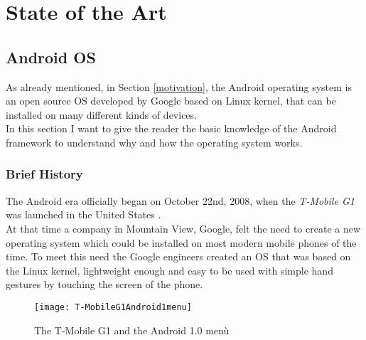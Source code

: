 %
%
\chapter{State of the Art}
%
\label{cap:statoarte}
%
%
\section{Android OS} \label{androidos}
\par As already mentioned, in Section \ref{motivation}, the Android operating system is an open source OS developed by Google based on Linux kernel, that can be installed on many different kinds of devices.\\
In this section I want to give the reader the basic knowledge of the Android framework to understand why and how the operating system works.
\subsection{Brief History} \label{briefhist}
\par
The Android era officially began on October 22nd, 2008, when the \textit{T-Mobile G1} was launched in the United States \cite{verge2011android}.\\
At that time a company in Mountain View, Google, felt the need to create a new operating system which could be installed on most modern mobile phones of the time. To meet this need the Google engineers created an OS that was based on the Linux kernel, lightweight enough and easy to be used with simple hand gestures by touching the screen of the phone.\\

\begin{figure}[h]
	\centering
	\texttt{[image: T-MobileG1Android1menu]}
	\caption{The T-Mobile G1 and the Android 1.0 menù}
	\label{2.1:The T-Mobile G1 and the Android 1.0 menù}
\end{figure}

